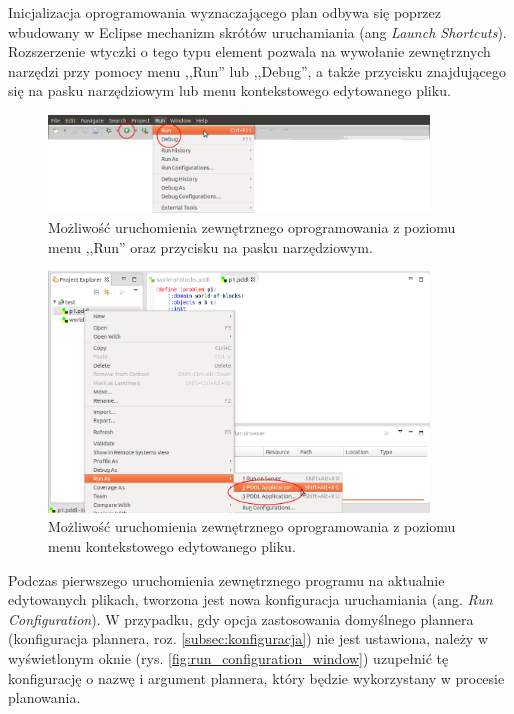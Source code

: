 Inicjalizacja oprogramowania wyznaczającego plan odbywa się poprzez wbudowany w Eclipse mechanizm skrótów uruchamiania (ang \textit{Launch Shortcuts}). Rozszerzenie wtyczki o tego typu element pozwala na wywołanie zewnętrznych narzędzi przy pomocy menu ,,Run'' lub ,,Debug'', a także przycisku znajdującego się na pasku narzędziowym lub menu kontekstowego edytowanego pliku.
\begin{figure}[h!]
    \centering
    \includegraphics[width=0.9\textwidth]{img/running_options_menu_toolbar}
    \caption{Możliwość uruchomienia zewnętrznego oprogramowania z poziomu menu ,,Run'' oraz przycisku na pasku narzędziowym.}
    \label{fig:running_options_menu_toolbar}
\end{figure}

\begin{figure}[h!]
    \centering
    \includegraphics[width=0.9\textwidth]{img/running_options_context_menu}
    \caption{Możliwość uruchomienia zewnętrznego oprogramowania z poziomu menu kontekstowego edytowanego pliku.}
    \label{fig:running_options_context_menu}
\end{figure}

Podczas pierwszego uruchomienia zewnętrznego programu na aktualnie edytowanych plikach, tworzona jest nowa konfiguracja uruchamiania (ang. \textit{Run Configuration}). W przypadku, gdy opcja zastosowania domyślnego plannera (konfiguracja plannera, roz. \ref{subsec:konfiguracja}) nie jest ustawiona, należy w wyświetlonym oknie (rys. \ref{fig:run_configuration_window}) uzupełnić tę konfigurację o nazwę i argument plannera, który będzie wykorzystany w procesie planowania. 

